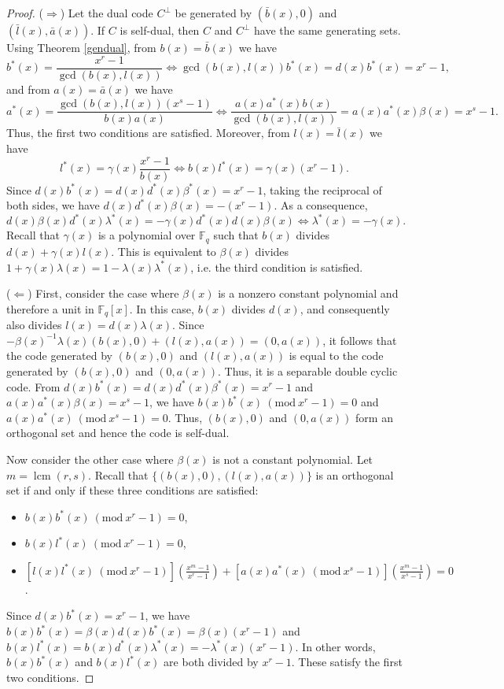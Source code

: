 \documentclass[12pt]{article}
\newcommand{\Mod}[1]{\ (\mathrm{mod}\ #1)}
\begin{document}
	\begin{proof}
		($\Rightarrow$) Let the dual code $C^{\perp}$ be generated by $(\bar{b}(x),0)$ and $(\bar{l}(x),\bar{a}(x))$. If $C$ is self-dual, then $C$ and $C^{\perp}$ have the same generating sets. Using Theorem \ref{gendual}, from $b(x)=\bar{b}(x)$ we have $$b^{*}(x)=\frac{x^r-1}{\gcd(b(x),l(x))}\Leftrightarrow \gcd(b(x),l(x)) b^{*}(x) = d(x) b^{*}(x)= x^r-1,$$ and from $a(x)=\bar{a}(x)$ we have $$
		a^{*}(x)=\frac{\gcd(b(x),l(x))(x^s-1)}{b(x) a(x)} \Leftrightarrow \frac{a(x)a^{*}(x)b(x)}{\gcd(b(x),l(x))}=a(x)a^{*}(x)\beta(x)=x^s-1.$$
		Thus, the first two conditions are satisfied. Moreover, from $l(x)=\bar{l}(x)$ we have $$l^{*}(x)=\gamma(x) \frac{x^r-1}{b(x)}\Leftrightarrow b(x)l^{*}(x)=\gamma(x) (x^r-1).$$ Since $d(x)b^{*}(x)=d(x)d^{*}(x)\beta^{*}(x)=x^r-1$, taking the reciprocal of both sides, we have $d(x)d^{*}(x)\beta(x)=-(x^r-1)$. As a consequence, $$d(x)\beta(x) d^{*}(x)\lambda^{*}(x)=-\gamma(x)d^{*}(x)d(x)\beta(x)\Leftrightarrow \lambda^{*}(x)=-\gamma(x).$$
		Recall that $\gamma(x)$ is a polynomial over $\mathbb{F}_q$ such that $b(x)$ divides $d(x)+\gamma(x)l(x)$. This is equivalent to $\beta(x)$ divides $1+\gamma(x)\lambda(x)=1-\lambda(x)\lambda^{*}(x)$, i.e. the third condition is satisfied.
		
		($\Leftarrow$) First, consider the case where $\beta(x)$ is a nonzero constant polynomial and therefore a unit in $\mathbb{F}_q[x]$. In this case, $b(x)$ divides $d(x)$, and consequently also divides $l(x)=d(x)\lambda(x)$. Since $-\beta(x)^{-1}\lambda(x)(b(x),0)+(l(x),a(x))=(0,a(x))$, it follows that the code generated by $(b(x),0)$ and $(l(x),a(x))$ is equal to the code generated by $(b(x),0)$ and $(0,a(x))$. Thus, it is a separable double cyclic code. From $d(x)b^*(x)=d(x)d^*(x)\beta^*(x)=x^r-1$ and $a(x)a^{*}(x)\beta(x)=x^s-1$, we have $b(x)b^{*}(x)\Mod{x^r-1}=0$ and $a(x)a^{*}(x)\Mod{x^s-1}=0$. Thus, $(b(x),0)$ and $(0,a(x))$ form an orthogonal set and hence the code is self-dual.
		
		Now consider the other case where $\beta(x)$ is not a constant polynomial. Let $m=\operatorname{lcm}(r,s)$. Recall that $\{(b(x),0),(l(x),a(x))\}$ is an orthogonal set if and only if these three conditions are satisfied:
		\begin{itemize}
			\item $b(x)b^{*}(x)\Mod{x^r-1}=0$,
			\item $b(x)l^{*}(x)\Mod{x^r-1}=0$,
			\item $\left[l(x)l^{*}(x)\Mod{x^r-1}\right] \left(\frac{x^m-1}{x^r-1}\right)+\left[a(x)a^{*}(x)\Mod{x^s-1}\right]\left(\frac{x^m-1}{x^s-1}\right)=0$.
		\end{itemize}
		Since $d(x) b^{*}(x) = x^r-1$, we have $b(x)b^{*}(x)=\beta(x) d(x)b^{*}(x)=\beta(x)(x^r-1)$ and $b(x)l^{*}(x)=b(x) d^{*}(x)\lambda^{*}(x)=-\lambda^{*}(x)(x^r-1)$. In other words, $b(x)b^{*}(x)$ and $b(x)l^{*}(x)$ are both divided by $x^r-1$. These satisfy the first two conditions.
		

\end{proof}
\end{document}
